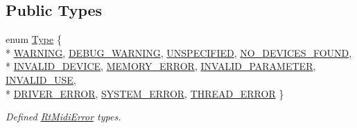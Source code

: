 \subsection*{Public Types}
\begin{DoxyCompactItemize}
\item 
enum \hyperlink{class_rt_midi_error_a741314057cec5fb8c743c12f284905ee}{Type} \{ \\*
\hyperlink{class_rt_midi_error_a741314057cec5fb8c743c12f284905eea778e66d730c9ff2aab7000aed36ca8df}{W\+A\+R\+N\+I\+NG}, 
\hyperlink{class_rt_midi_error_a741314057cec5fb8c743c12f284905eead9dcf332975d9d0358f7db349d565c8a}{D\+E\+B\+U\+G\+\_\+\+W\+A\+R\+N\+I\+NG}, 
\hyperlink{class_rt_midi_error_a741314057cec5fb8c743c12f284905eeabd80a28d9fedd9a861c72d3fae096a79}{U\+N\+S\+P\+E\+C\+I\+F\+I\+ED}, 
\hyperlink{class_rt_midi_error_a741314057cec5fb8c743c12f284905eea2edbf3e6f6b2383bc3e352b4417326d7}{N\+O\+\_\+\+D\+E\+V\+I\+C\+E\+S\+\_\+\+F\+O\+U\+ND}, 
\\*
\hyperlink{class_rt_midi_error_a741314057cec5fb8c743c12f284905eea8c87118f56675ecd8fd859e01a61338a}{I\+N\+V\+A\+L\+I\+D\+\_\+\+D\+E\+V\+I\+CE}, 
\hyperlink{class_rt_midi_error_a741314057cec5fb8c743c12f284905eea4a3fe6c709b50a4c85c470406ea4fddf}{M\+E\+M\+O\+R\+Y\+\_\+\+E\+R\+R\+OR}, 
\hyperlink{class_rt_midi_error_a741314057cec5fb8c743c12f284905eea707297abd1e7f447f0823a9de2ee1d8f}{I\+N\+V\+A\+L\+I\+D\+\_\+\+P\+A\+R\+A\+M\+E\+T\+ER}, 
\hyperlink{class_rt_midi_error_a741314057cec5fb8c743c12f284905eea25eb917874adfebc2029c41072aef05a}{I\+N\+V\+A\+L\+I\+D\+\_\+\+U\+SE}, 
\\*
\hyperlink{class_rt_midi_error_a741314057cec5fb8c743c12f284905eeaacbd6476ea9704d758d03b7175f5c4c9}{D\+R\+I\+V\+E\+R\+\_\+\+E\+R\+R\+OR}, 
\hyperlink{class_rt_midi_error_a741314057cec5fb8c743c12f284905eeaf2708443eebfe5dcd0f656e22a73cfd8}{S\+Y\+S\+T\+E\+M\+\_\+\+E\+R\+R\+OR}, 
\hyperlink{class_rt_midi_error_a741314057cec5fb8c743c12f284905eea9928f70b060712c44f4f23432bc8b76c}{T\+H\+R\+E\+A\+D\+\_\+\+E\+R\+R\+OR}
 \}\begin{DoxyCompactList}\small\item\em Defined \hyperlink{class_rt_midi_error}{Rt\+Midi\+Error} types. \end{DoxyCompactList}
\end{DoxyCompactItemize}

